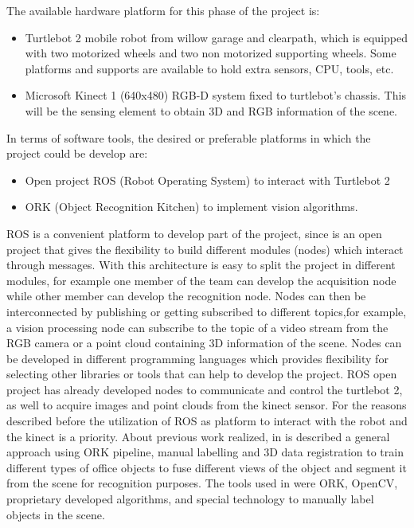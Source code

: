 \documentclass[fontsize=12pt]{article}
\begin{document}
The available hardware platform for this phase of the project is:
\begin{itemize}
\item Turtlebot 2 mobile robot from willow garage and clearpath, which is equipped with two motorized wheels and two non motorized supporting wheels. Some platforms and supports are available to hold extra sensors, CPU, tools, etc. 
\item Microsoft Kinect  1 (640x480) RGB-D system fixed to turtlebot's chassis. This will be the sensing element to obtain 3D and RGB information of the scene. 
\end{itemize}
In terms of software tools, the desired or preferable platforms  in which the project could be develop are:
\begin{itemize}
\item Open project ROS (Robot Operating System) to interact with Turtlebot 2 \cite{bib:ROS} 
\item ORK (Object Recognition Kitchen)\cite{bib:ORK} to implement vision algorithms. 
\end{itemize}
ROS is a convenient platform to develop part of the project, since is an open project that gives the flexibility to build different modules (nodes) which interact through messages. With this architecture is easy to split the project in different modules, for example one member of the team can develop the acquisition node while other member can develop the recognition node. Nodes can then be interconnected  by publishing or getting subscribed to different topics,for example, a vision processing node can subscribe to the topic of a video stream from the RGB camera or a point cloud containing 3D information of the scene. Nodes can be developed in different programming languages which provides flexibility for selecting other libraries or tools that can help to develop the project. ROS open project has already developed nodes to communicate and control the turtlebot 2, as well to  acquire images and point clouds from the kinect sensor. 
For the reasons described before the utilization of ROS  as platform to interact with the robot and the kinect is a priority.
About previous work realized, in \cite{bib:semantic} is described a general approach using ORK pipeline, manual labelling and 3D data registration to train different types of office objects to fuse different views of the object and segment it from the scene for recognition purposes. The tools used in \cite{bib:semantic} were ORK, OpenCV, proprietary developed algorithms, and special technology to manually label objects in the scene. \\
\end{document}
